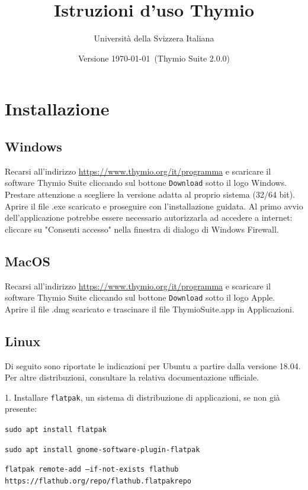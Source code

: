 \documentclass[12pt]{article}
\title{Istruzioni d'uso Thymio}
\author{Università della Svizzera Italiana}
\date{Versione \today \ (Thymio Suite 2.0.0)}
\begin{document}
\maketitle
\tableofcontents
\newpage


\section{Installazione}\label{installation}

	\subsection{Windows}
	
		Recarsi all'indirizzo \url{https://www.thymio.org/it/programma} e scaricare il software Thymio Suite cliccando sul bottone \texttt{Download} sotto il logo Windows. Prestare attenzione a scegliere la versione adatta al proprio sistema (32/64 bit).\\
		Aprire il file .exe scaricato e proseguire con l'installazione guidata. Al primo avvio dell'applicazione potrebbe essere necessario autorizzarla ad accedere a internet: cliccare su "Consenti accesso" nella finestra di dialogo di Windows Firewall.
		
	\subsection{MacOS}
	
		Recarsi all'indirizzo \url{https://www.thymio.org/it/programma} e scaricare il software Thymio Suite cliccando sul bottone \texttt{Download} sotto il logo Apple.\\	
		Aprire il file .dmg scaricato e trascinare il file ThymioSuite.app in Applicazioni.
		
	\subsection{Linux}
	
		Di seguito sono riportate le indicazioni per Ubuntu a partire dalla versione 18.04. Per altre distribuzioni, consultare la relativa documentazione ufficiale.
		
		1. Installare \texttt{flatpak}, un sistema di distribuzione di applicazioni, se non già presente:
		
		\texttt{sudo apt install flatpak}
		
		\texttt{sudo apt install gnome-software-plugin-flatpak}
		
		\texttt{flatpak remote-add --if-not-exists flathub https://flathub.org/repo/flathub.flatpakrepo}
		
\end{document}
